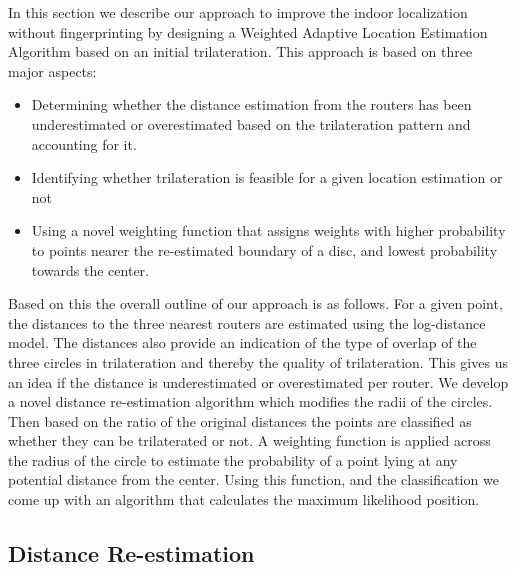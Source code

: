 \documentclass[twocolumn, 11pt]{IEEEtran}
\begin{document}
In this section we describe our approach to improve the indoor localization without fingerprinting by designing a Weighted Adaptive Location Estimation Algorithm based on an initial trilateration. This approach is based on three major aspects:
\begin{itemize}
\item Determining whether the distance estimation from the routers has been underestimated or overestimated based on the trilateration pattern and accounting for it. 

\item Identifying whether trilateration is feasible for a given location estimation or not

\item Using a novel weighting function that assigns weights with higher probability to points nearer the re-estimated boundary of a disc, and lowest probability towards the center. 
\end{itemize}

Based on this the overall outline of our approach is as follows. For a given point, the distances to the three nearest routers are estimated using the log-distance model. The distances also provide an indication of the type of overlap of the three circles in trilateration and thereby the quality of trilateration. This gives us an idea if the distance is underestimated or overestimated per router. We develop a novel distance re-estimation algorithm which modifies the radii of the circles. Then based on the ratio of the original distances the points are classified as whether they can be trilaterated or not.  A weighting function is applied across the radius of the circle to estimate the probability of a point lying at any potential distance from the center. Using this function, and the classification we come up with an algorithm that calculates the maximum likelihood position. 

\subsection{Distance Re-estimation}
\end{document}
